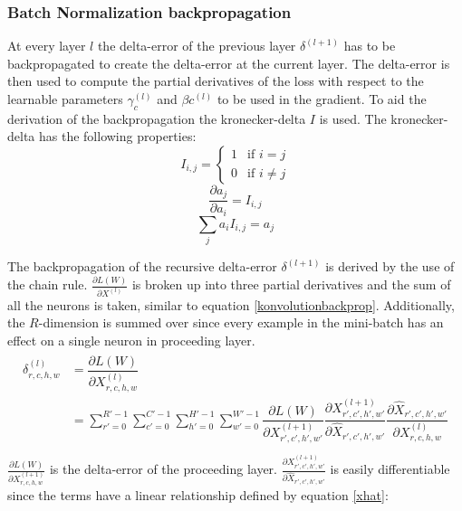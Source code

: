\documentclass[a4paper,11pt,twoside]{article}
\newcommand*{\pd}[2]{\ensuremath{\dfrac{\partial #1}{\partial #2}}}
\newcommand*{\inpd}[2]{\ensuremath{\frac{\partial #1}{\partial #2}}}
\begin{document}
\subsubsection{Batch Normalization backpropagation}
At every layer $l$ the delta-error of the previous layer $\delta^{(l+1)}$ has to be backpropagated to create the delta-error at the current layer. The delta-error is then used to compute the partial derivatives of the loss with respect to the learnable parameters $\gamma_{c}^{(l)}$ and $\beta{c}^{(l)}$ to be used in the gradient. To aid the derivation of the backpropagation the kronecker-delta $I$ is used. The kronecker-delta has the following properties: \cite{webBN1} \cite{webBN2}
\begin{equation}\label{kroneckerdelta}
I_{i,j} = \begin{cases} 1 & \mbox{if } i = j \\ 0 & \mbox{if } i \neq j  \end{cases}
\end{equation}
\begin{equation}\label{kroneckerdeltaDERIVATIVE}
\pd{a_{j}}{a_i} = I_{i,j}
\end{equation}
\begin{equation}\label{kroneckerdeltaSUM}
\sum_j  a_i  I_{i,j} = a_j
\end{equation}

The backpropagation of the recursive delta-error $\delta^{(l+1)}$ is derived by the use of the chain rule. $\inpd{L(W)}{X^{(l)}}$ is broken up into three partial derivatives and the sum of all the neurons is taken, similar to equation \eqref{konvolutionbackprop}. Additionally, the $R$-dimension is summed over since every example in the mini-batch has an effect on a single neuron in proceeding layer. \cite{webBN1} \cite{webBN2}
\begin{align}\label{BN_delta_error}
\begin{split}
	\delta^{(l)}_{r,c,h,w}
		& = \pd{L(W)}{X^{(l)}_{r,c,h,w}} \\
		& = \sum^{R'-1}_{r'=0} \sum^{C'-1}_{c'=0} \sum^{H'-1}_{h'=0} \sum^{W'-1}_{w'=0} \pd{L(W)}{X^{(l+1)}_{r',c',h',w'}} \pd{X^{(l+1)}_{r',c',h',w'}}{\hat{X}_{r',c',h',w'}} \pd{\hat{X}_{r',c',h',w'}}{{X}^{(l)}_{r,c,h,w}}\\
\end{split}
\end{align}
$\inpd{L(W)}{X^{(l+1)}_{r,c,h,w}}$ is the delta-error of the proceeding layer. $\inpd{X^{(l+1)}_{r',c',h',w'}}{\hat{X}_{r',c',h',w'}}$ is easily differentiable since the terms have a linear relationship defined by equation \eqref{xhat}: \cite{webBN1} \cite{webBN2}
\end{document}
